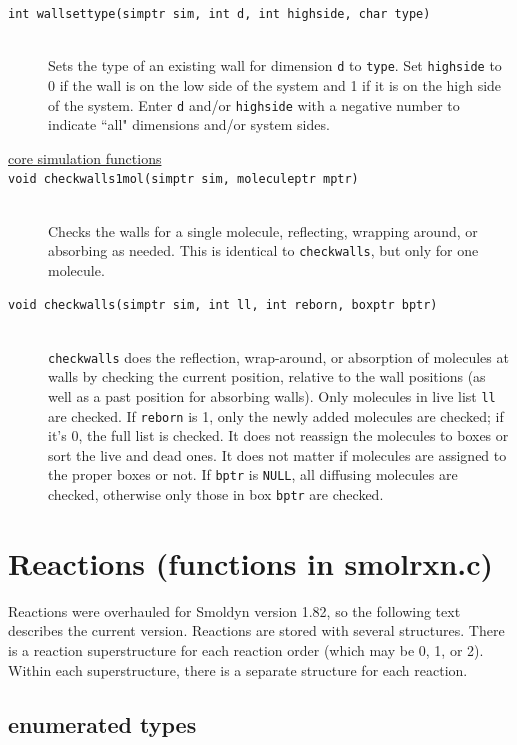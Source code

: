\documentclass {scrbook}
\newcommand {\ttt} {\texttt}
\begin{document}
\begin{description}
\item[\ttt{int wallsettype(simptr sim, int d, int highside, char type)}]
\hfill \\
Sets the type of an existing wall for dimension \ttt{d} to \ttt{type}. Set \ttt{highside} to 0 if the wall is on the low side of the system and 1 if it is on the high side of the system. Enter \ttt{d} and/or \ttt{highside} with a negative number to indicate ``all" dimensions and/or system sides.

\item[\underline{core simulation functions}]

\item[\ttt{void checkwalls1mol(simptr sim, moleculeptr mptr)}]
\hfill \\
Checks the walls for a single molecule, reflecting, wrapping around, or absorbing as needed. This is identical to \ttt{checkwalls}, but only for one molecule.

\item[\ttt{void checkwalls(simptr sim, int ll, int reborn, boxptr bptr)}]
\hfill \\
\ttt{checkwalls} does the reflection, wrap-around, or absorption of molecules at walls by checking the current position, relative to the wall positions (as well as a past position for absorbing walls). Only molecules in live list \ttt{ll} are checked. If \ttt{reborn} is 1, only the newly added molecules are checked; if it's 0, the full list is checked. It does not reassign the molecules to boxes or sort the live and dead ones. It does not matter if molecules are assigned to the proper boxes or not. If \ttt{bptr} is \ttt{NULL}, all diffusing molecules are checked, otherwise only those in box \ttt{bptr} are checked.

\end{description}

\section{Reactions (functions in smolrxn.c)}

Reactions were overhauled for Smoldyn version 1.82, so the following text describes the current version. Reactions are stored with several structures. There is a reaction superstructure for each reaction order (which may be 0, 1, or 2). Within each superstructure, there is a separate structure for each reaction.

\subsection{enumerated types}
\end{document}
